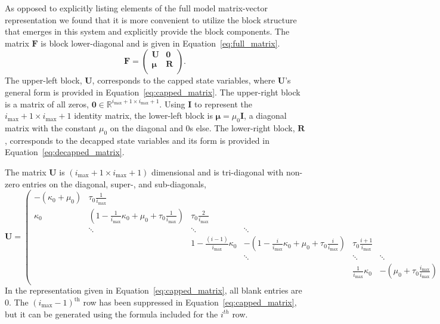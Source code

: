 \documentclass[review]{elsarticle}
\newcommand{\imax}{\ensuremath{{i_{\max}}}\xspace}
\let\bs\boldsymbol
\begin{document}
As opposed to explicitly listing elements of the full model matrix-vector representation we found that it is more convenient to utilize the block structure that emerges in this system and explicitly provide the block components.
The matrix $\bs{F}$ is block lower-diagonal and is given in Equation~\ref{eq:full_matrix}.
\begin{equation}
\bs{F}=\left(\begin{array}{cc}
\bs{U} & \bs{0} \\
\bs{\mu} & \bs{R} \\
\end{array} \right).
\end{equation}
The upper-left block, $\bs{U}$, corresponds to the capped state variables, where $\bs{U}$'s general form is provided in Equation~\ref{eq:capped_matrix}.
The upper-right block is a matrix of all zeros, $\bs{0}\in\mathbb{R}^{\imax+1\times \imax+1}$.
Using $\bs{I}$ to represent the $\imax+1\times \imax+1$ identity matrix, the lower-left block is $\bs{\mu}=\mu_0\bs{I}$, a diagonal matrix with the constant $\mu_0$ on the diagonal and 0s else.
The lower-right block, $\bs{R}$, corresponds to the decapped state variables and its form is provided in Equation~\ref{eq:decapped_matrix}.

The matrix $\bs{U}$ is $(\imax+1\times \imax+1)$ dimensional and is tri-diagonal with non-zero entries on the diagonal, super-, and sub-diagonals,
\begin{equation}
\bs{U}=\left(\begin{array}{cccccc}
-(\kappa_0+\mu_0) & \tau_0\frac{1}{\imax} &  &  &  & \\
\kappa_0 & \left(1-\frac{1}{\imax} \kappa_0+\mu_0+\tau_0\frac{1}{\imax}\right) & \tau_0\frac{2}{\imax} &  &  & \\
   &\ddots        & \ddots        & \ddots & &  \\
   & &    1-\frac{(i-1)}{\imax}\kappa_0 & -\left(1-\frac{i}{\imax}\kappa_0+\mu_0+\tau_0\frac{i}{\imax}\right) & \tau_0\frac{i+1}{\imax} & \\
                  &         &        & \ddots  & \ddots & \ddots \\
     
                          &        &  &  & \frac{1}{\imax}\kappa_0 & -\left(\mu_0+\tau_0\frac{\imax}{\imax}\right) \\
\end{array}\right).
\end{equation}
In the representation given in Equation~\ref{eq:capped_matrix}, all blank entries are 0.
The $(\imax-1)^{\text{th}}$ row has been suppressed in Equation~\ref{eq:capped_matrix}, but it can be generated using the formula included for the $i^{th}$ row.
\end{document}
